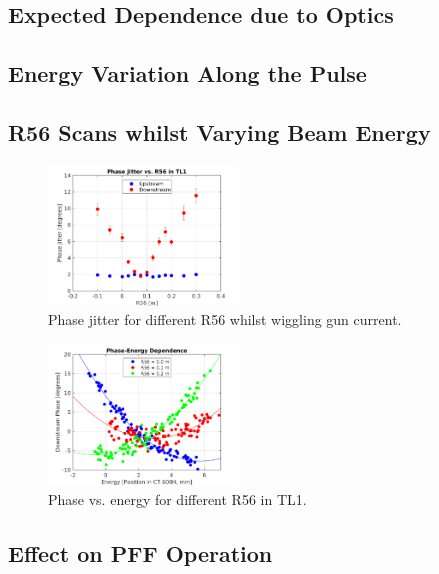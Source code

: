 
\subsection{Expected Dependence due to Optics}
\label{ss:t566Sim}

\subsection{Energy Variation Along the Pulse}
\label{ss:energyAlongPulse}

\subsection{R56 Scans whilst Varying Beam Energy}
\label{ss:r56ScanWithEnergy}

\begin{figure}
  \centering
  \includegraphics[width=0.45\textwidth]{Figures/R56ScanGunWiggle_PhaseJitter}
  \caption{Phase jitter for different R56 whilst wiggling gun current.}
  \label{f:R56ScanGunWiggle_PhaseJitter}
\end{figure}

\begin{figure}
  \centering
  \includegraphics[width=0.45\textwidth]{Figures/R56ScanGunWiggle_Vs608}
  \caption{Phase vs. energy for different R56 in TL1.}
  \label{f:R56ScanGunWiggle_Vs608}
\end{figure}

\subsection{Effect on PFF Operation}
\label{ss:t566EffectPFF}


